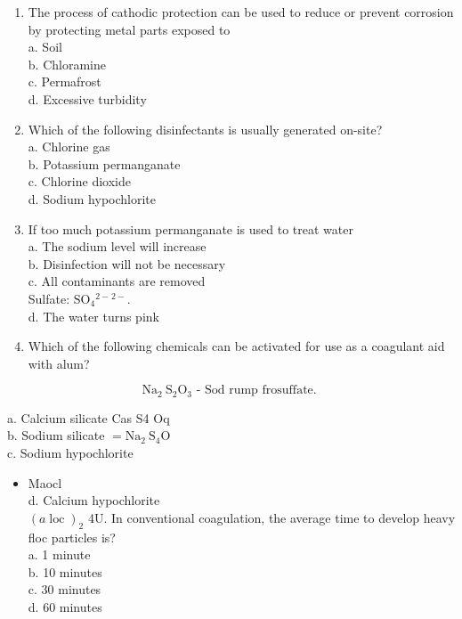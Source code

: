 \documentclass[10pt]{article}
\begin{document}
\begin{enumerate}
  \item The process of cathodic protection can be used to reduce or prevent corrosion by protecting metal parts exposed to\\
a. Soil\\
b. Chloramine\\
c. Permafrost\\
d. Excessive turbidity

  \item Which of the following disinfectants is usually generated on-site?\\
a. Chlorine gas\\
b. Potassium permanganate\\
c. Chlorine dioxide\\
d. Sodium hypochlorite

  \item If too much potassium permanganate is used to treat water\\
a. The sodium level will increase\\
b. Disinfection will not be necessary\\
c. All contaminants are removed\\
Sulfate: $\mathrm{SO}_{4}{ }^{2-}{ }^{2-}$.\\
d. The water turns pink

  \item Which of the following chemicals can be activated for use as a coagulant aid with alum?

\end{enumerate}

$$
\mathrm{Na}_{2} \mathrm{~S}_{2} \mathrm{O}_{3} \text { - Sod rump frosuffate. }
$$

a. Calcium silicate Cas S4 Oq\\
b. Sodium silicate $=\mathrm{Na}_{2} \mathrm{~S}_{4} \mathrm{O}$\\
c. Sodium hypochlorite

\begin{itemize}
  \item Maocl\\
d. Calcium hypochlorite\\
$(a \operatorname{loc})_{2}$ 4U. In conventional coagulation, the average time to develop heavy floc particles is?\\
a. 1 minute\\
b. 10 minutes\\
c. 30 minutes\\
d. 60 minutes
\end{itemize}
\end{document}
